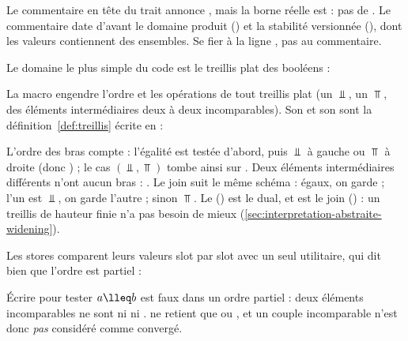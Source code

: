 \begin{piege}
  Le commentaire en tête du trait annonce , mais la borne
  réelle est  : pas de
  . Le commentaire date d'avant le domaine produit () et la
  stabilité versionnée (), dont les valeurs contiennent des ensembles.
  Se fier à la ligne , pas au commentaire.
\end{piege}

Le domaine le plus simple du code est le treillis plat des booléens :


La macro  engendre l'ordre et les opérations de tout
treillis plat (un $\Bot$, un $\Top$, des éléments intermédiaires deux à deux
incomparables). Son  et son  sont la
définition~\ref{def:treillis} écrite en  :


L'ordre des bras compte : l'égalité est testée d'abord, puis
\og $\Bot$ à gauche ou $\Top$ à droite\fg{} (donc ) ; le cas
$(\Bot, \Top)$ tombe ainsi sur . Deux éléments intermédiaires
différents n'ont aucun bras : . Le join suit le même schéma : égaux,
on garde ; l'un est $\Bot$, on garde l'autre ; sinon $\Top$. Le 
() est le dual, et  est le join
() : un treillis de hauteur finie n'a pas
besoin de mieux (\cref{sec:interpretation-abstraite-widening}).

Les stores comparent leurs valeurs slot par slot avec un seul utilitaire, qui
dit bien que l'ordre est partiel :


\begin{piege}
  Écrire  pour tester $a \lleq b$ est faux dans un ordre
  partiel : deux éléments incomparables ne sont ni \code{>} ni \code{<=}.
   ne retient que  ou , et un
  couple incomparable n'est donc \emph{pas} considéré comme convergé.
\end{piege}

